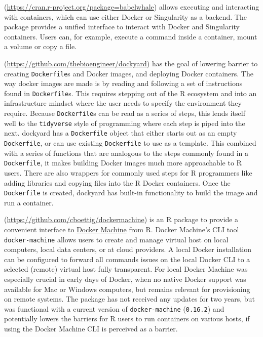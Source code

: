 \textbf{}
(\url{https://cran.r-project.org/package=babelwhale}) allows executing
and interacting with containers, which can use either Docker or
Singularity as a backend. The package provides a unified interface to
interact with Docker and Singularity containers. Users can, for example,
execute a command inside a container, mount a volume or copy a file.

\textbf{}
(\url{https://github.com/thebioengineer/dockyard}) has the goal of
lowering barrier to creating \texttt{Dockerfile}s and Docker images, and
deploying Docker containers. The way docker images are made is by
reading and following a set of instructions found in
\texttt{Dockerfile}s. This requires stepping out of the R ecosystem and
into an infrastructure mindset where the user needs to specify the
environment they require. Because \texttt{Dockerfile}s can be read as a
series of steps, this lends itself well to the \texttt{tidyverse} style
of programming where each step is piped into the next. dockyard has a
\texttt{Dockerfile} object that either starts out as an empty
\texttt{Dockerfile}, or can use existing \texttt{Dockerfile} to use as a
template. This combined with a series of functions that are analogous to
the steps commonly found in a \texttt{Dockerfile}, it makes building
Docker images much more approachable to R users. There are also wrappers
for commonly used steps for R programmers like adding libraries and
copying files into the R Docker containers. Once the \texttt{Dockerfile}
is created, dockyard has built-in functionality to build the image and
run a container.

\textbf{}
(\url{https://github.com/cboettig/dockermachine}) is an R package to
provide a convenient interface to
\href{https://docs.docker.com/machine/overview/}{Docker Machine} from R.
Docker Machine's CLI tool \texttt{docker-machine} allows users to create
and manage virtual host on local computers, local data centers, or at
cloud providers. A local Docker installation can be configured to
forward all commands issues on the local Docker CLI to a selected
(remote) virtual host fully transparent. For local Docker Machine was
especially crucial in early days of Docker, when no native Docker
support was available for Mac or Windows computers, but remains relevant
for provisioning on remote systems. The package has not received any
updates for two years, but was functional with a current version of
\texttt{docker-machine} (\texttt{0.16.2}) and potentially lowers the
barriers for R users to run containers on various hosts, if using the
Docker Machine CLI is perceived as a barrier.

